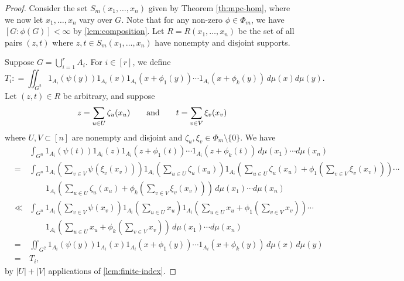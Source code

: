 \begin{proof}Consider the set $S_m(x_1, \ldots, x_n)$ given by Theorem \ref{th:mpc-hom}, where we now let $x_1, \ldots, x_n$ vary over $G$. Note that for any non-zero $\phi \in \Phi_m$, we have $[G:\phi(G)] < \infty$ by \cref{lem:composition}. Let $R=R(x_1, \ldots, x_n)$ be the set of all pairs $(z, t)$ where $z, t \in S_m(x_1, \ldots, x_n)$ have nonempty and disjoint supports.

Suppose $G = \bigcup_{i=1}^r A_i$. For $i \in [r]$, we define
\[
T_i : = \iint_{G^2} 1_{A_i}( \psi(y) )  1_{A_i}(x) 1_{A_i}(x+ \phi_1(y)) \cdots 1_{A_i}(x+ \phi_k(y)) \, d\mu(x) d\mu(y). 
\]
Let $(z,t) \in R$ be arbitrary, and suppose
\[
z = \sum_{u \in U} \zeta_u(x_u) \qquad \textup{and} \qquad t = \sum_{v \in V} \xi_v (x_v)
\]
where $U, V \subset [n]$ are nonempty and disjoint and $\zeta_u, \xi_v \in \Phi_m \setminus \{ 0\}$. We have
\begin{eqnarray*}
& & \int_{G^n}  1_{A_i}( \psi(t)) 1_{A_i}(z) 
1_{A_i}(z+ \phi_1(t)) \cdots 1_{A_i}(z+ \phi_k(t)) \, d\mu(x_1) \cdots d\mu(x_n) \\
& = & \int_{G^n} 1_{A_i} \left( \sum_{v \in V} \psi( \xi_v (x_v) ) \right) 
1_{A_i} \left( \sum_{u \in U} \zeta_u(x_u)\right)
1_{A_i} \left( \sum_{u \in U} \zeta_u(x_u)  + \phi_1 \left( \sum_{v \in V} \xi_v (x_v) \right) \right) \cdots \\
& & \qquad 1_{A_i} \left( \sum_{u \in U} \zeta_u(x_u)  + \phi_k \left( \sum_{v \in V} \xi_v (x_v) \right)  \right) \, d\mu(x_1) \cdots d \mu(x_n) \\
& \ll & \int_{G^n} 1_{A_i} \left( \sum_{v \in V} \psi( x_v ) \right) 
1_{A_i} \left( \sum_{u \in U} x_u \right)
1_{A_i} \left( \sum_{u \in U} x_u  + \phi_1 \left( \sum_{v \in V} x_v \right) \right) \cdots \\
& & \qquad 1_{A_i} \left( \sum_{u \in U} x_u  + \phi_k \left( \sum_{v \in V} x_v \right)  \right) \, d\mu(x_1) \cdots d \mu(x_n) \\
& = & \iint_{G^2} 1_{A_i}( \psi(y) ) 1_{A_i}(x) 1_{A_i}(x  + \phi_1(y) ) \cdots 1_{A_i}(x  + \phi_k(y) ) \, d\mu(x) \, d\mu(y) \\
&=& T_i, 
\end{eqnarray*}
by $|U|+|V|$ applications of \cref{lem:finite-index}. 



\end{proof}
